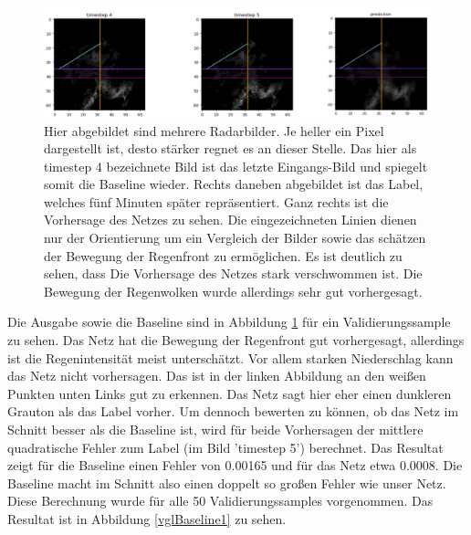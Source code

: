 \begin{figure}[h]
	\centering
	\includegraphics[width=\linewidth]{pics/mse_vgl1.png}
	\caption[Radarbilder für fünf-minuten Vorhersage]{Hier abgebildet sind mehrere Radarbilder. Je heller ein Pixel dargestellt ist, desto stärker regnet es an dieser Stelle. Das hier als timestep 4 bezeichnete Bild ist das letzte Eingangs-Bild und spiegelt somit die Baseline wieder. Rechts daneben abgebildet ist das Label, welches fünf Minuten später repräsentiert. Ganz rechts ist die Vorhersage des Netzes zu sehen. Die eingezeichneten Linien dienen nur der Orientierung um ein Vergleich der Bilder sowie das schätzen der Bewegung der Regenfront zu ermöglichen. Es ist deutlich zu sehen, dass Die Vorhersage des Netzes stark verschwommen ist. Die Bewegung der Regenwolken wurde allerdings sehr gut vorhergesagt. }
	\label{mse_VGL1}
\end{figure}

Die Ausgabe sowie die Baseline sind in Abbildung \ref{mse_VGL1} für ein Validierungssample zu sehen. Das Netz hat die Bewegung der Regenfront gut vorhergesagt, allerdings ist die Regenintensität meist unterschätzt. Vor allem starken Niederschlag kann das Netz nicht vorhersagen. Das ist in der linken Abbildung an den weißen Punkten unten Links gut zu erkennen. Das Netz sagt hier eher einen dunkleren Grauton als das Label vorher. Um dennoch bewerten zu können, ob das Netz im Schnitt besser als die Baseline ist, wird für beide Vorhersagen der mittlere quadratische Fehler zum Label (im Bild 'timestep 5') berechnet. Das Resultat zeigt für die Baseline einen Fehler von 0.00165 und für das Netz etwa 0.0008. Die Baseline macht im Schnitt also einen doppelt so großen Fehler wie unser Netz. Diese Berechnung wurde für alle 50 Validierungssamples vorgenommen. Das Resultat ist in Abbildung \ref{vglBaseline1} zu sehen.


